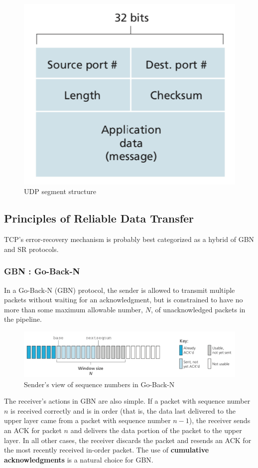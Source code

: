 \documentclass[11pt]{article}
\begin{document}
\begin{figure}[h]
	\centering
	\includegraphics[width=0.4\linewidth]{images/udp.png}
	\caption{UDP segment structure}
	\label{fig:udp}
\end{figure}

\subsection{Principles of Reliable Data Transfer}

TCP’s error-recovery mechanism is probably best categorized as a hybrid of GBN and SR protocols.

\subsubsection{GBN : Go-Back-N}

In a Go-Back-N (GBN) protocol, the sender is allowed to transmit multiple packets without waiting for an acknowledgment, but is constrained to have no more than some maximum allowable number, $N$, of unacknowledged packets in the pipeline.

\begin{figure}[h]
	\centering
	\includegraphics[width=0.8\linewidth]{images/GBN.png}
	\caption{Sender’s view of sequence numbers in Go-Back-N}
	\label{fig:GBN}
\end{figure}

The receiver’s actions in GBN are also simple. If a packet with sequence number $n$ is received correctly and is in order (that is, the data last delivered to the upper layer came from a packet with sequence number $n - 1$), the receiver sends an ACK for packet $n$ and delivers the data portion of the packet to the upper layer. In all other cases, the receiver discards the packet and resends an ACK for the most recently received in-order packet. The use of \textbf{cumulative acknowledgments} is a natural choice for GBN.
\end{document}
